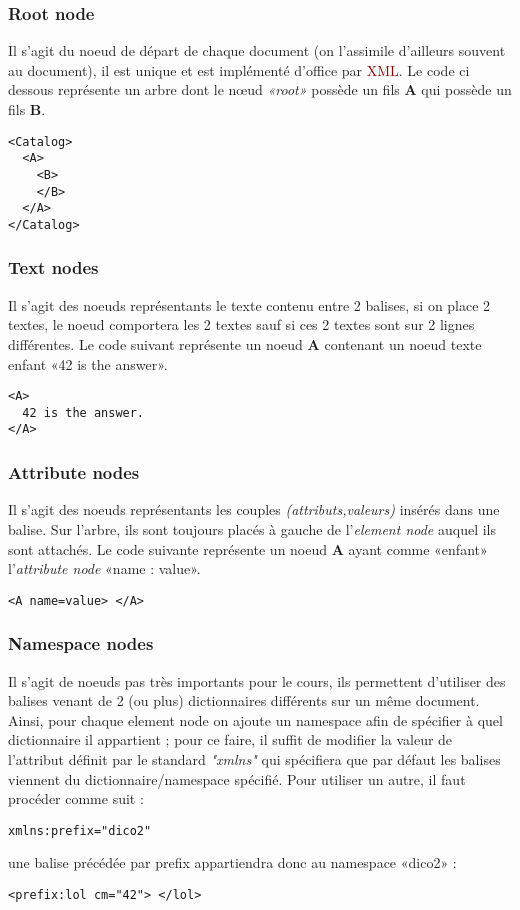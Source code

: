 \documentclass{article}
\newcommand{\ora}[1]{\textcolor{darko}{#1}}
\newcommand{\red}[1]{\textcolor{darkred}{#1}}
\begin{document}
\subsubsection{Root node}
Il s'agit du noeud de départ de chaque document (on l'assimile d'ailleurs souvent au document), il est unique et est implémenté d'office par \red{XML}. Le code ci dessous 
représente un arbre dont le n\oe ud \textit{«root»} possède un fils \textbf{A} qui possède un fils \textbf{B}.
\begin{verbatim}
<Catalog>
  <A>
    <B>
    </B>
  </A>
</Catalog>
\end{verbatim}
\subsubsection{Text nodes}
Il s'agit des noeuds représentants le texte contenu entre 2 balises, si on place 2 textes, le noeud comportera les 2 textes sauf si ces 2 textes sont sur 2 lignes différentes.
Le code suivant représente un noeud \textbf{A} contenant un noeud texte enfant «42 is the answer».
\begin{verbatim}
<A>
  42 is the answer.
</A>
\end{verbatim}
\subsubsection{Attribute nodes}
Il s'agit des noeuds représentants les couples \textit{(attributs,valeurs)} insérés dans une balise. Sur l'arbre, ils sont toujours placés à gauche de l'\textit{element node} auquel ils 
sont attachés. Le code suivante représente un noeud \textbf{A} ayant comme «enfant» l'\textit{attribute node} «name : value».
\begin{verbatim}
<A name=value> </A>
\end{verbatim}

\subsubsection{Namespace nodes}
Il s'agit de noeuds pas très importants pour le cours, ils permettent d'utiliser des balises venant de 2 (ou plus) dictionnaires différents sur un même document. Ainsi, pour chaque 
element node on ajoute un namespace afin de spécifier à quel dictionnaire il appartient ; pour ce faire, il suffit de modifier la valeur de l'attribut définit par le standard 
\ora{\textit{"xmlns"}} qui spécifiera que par défaut les balises viennent du dictionnaire/namespace spécifié. Pour utiliser un autre, il faut procéder comme suit : 
\begin{verbatim}
xmlns:prefix="dico2"
\end{verbatim}
une balise précédée par prefix appartiendra donc au namespace «dico2» : 
\begin{verbatim}
<prefix:lol cm="42"> </lol>
\end{verbatim}
\end{document}
